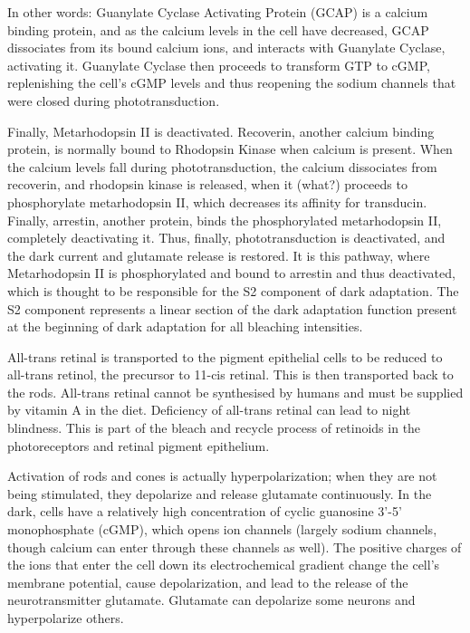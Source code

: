 In other words: Guanylate Cyclase Activating Protein (GCAP) is a calcium binding protein, and as the calcium levels in the cell have decreased, GCAP dissociates from its bound calcium ions, and interacts with Guanylate Cyclase, activating it. Guanylate Cyclase then proceeds to transform GTP to cGMP, replenishing the cell's cGMP levels and thus reopening the sodium channels that were closed during phototransduction.

Finally, Metarhodopsin II is deactivated. Recoverin, another calcium binding protein, is normally bound to Rhodopsin Kinase when calcium is present. When the calcium levels fall during phototransduction, the calcium dissociates from recoverin, and rhodopsin kinase is released, when it (what?) proceeds to phosphorylate metarhodopsin II, which decreases its affinity for transducin. Finally, arrestin, another protein, binds the phosphorylated metarhodopsin II, completely deactivating it. Thus, finally, phototransduction is deactivated, and the dark current and glutamate release is restored. It is this pathway, where Metarhodopsin II is phosphorylated and bound to arrestin and thus deactivated, which is thought to be responsible for the S2 component of dark adaptation. The S2 component represents a linear section of the dark adaptation function present at the beginning of dark adaptation for all bleaching intensities.

All-trans retinal is transported to the pigment epithelial cells to be reduced to all-trans retinol, the precursor to 11-cis retinal. This is then transported back to the rods. All-trans retinal cannot be synthesised by humans and must be supplied by vitamin A in the diet. Deficiency of all-trans retinal can lead to night blindness. This is part of the bleach and recycle process of retinoids in the photoreceptors and retinal pigment epithelium.

Activation of rods and cones is actually hyperpolarization; when they are not being stimulated, they depolarize and release glutamate continuously. In the dark, cells have a relatively high concentration of cyclic guanosine 3'-5' monophosphate (cGMP), which opens ion channels (largely sodium channels, though calcium can enter through these channels as well). The positive charges of the ions that enter the cell down its electrochemical gradient change the cell's membrane potential, cause depolarization, and lead to the release of the neurotransmitter glutamate. Glutamate can depolarize some neurons and hyperpolarize others.

